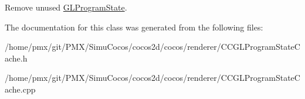 Remove unused \hyperlink{classGLProgramState}{G\+L\+Program\+State}. 

The documentation for this class was generated from the following files\+:\begin{DoxyCompactItemize}
\item 
/home/pmx/git/\+P\+M\+X/\+Simu\+Cocos/cocos2d/cocos/renderer/C\+C\+G\+L\+Program\+State\+Cache.\+h\item 
/home/pmx/git/\+P\+M\+X/\+Simu\+Cocos/cocos2d/cocos/renderer/C\+C\+G\+L\+Program\+State\+Cache.\+cpp\end{DoxyCompactItemize}
